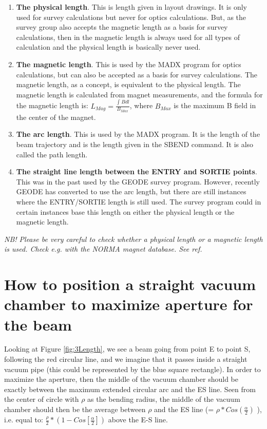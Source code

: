 \documentclass{cernatsnote}
\begin{document}
\begin{enumerate}
\item \textbf{The physical length}. This is length given in layout drawings. It is only used for survey calculations but never for optics calculations. But, as the survey group also accepts the magnetic length as a basis for survey calculations, then in the magnetic length is always used for all types of calculation and the physical length is basically never used.
\item \textbf{The magnetic length}. This is used by the MADX program for optics calculations, but can also be accepted as a basis for survey calculations. The magnetic length, as a concept, is equivalent to the physical length. The magnetic length is calculated from magnet measurements, and the formula for the magnetic length is: $L_{Mag}=\frac {\int_{ }^{ } B dl}{B_{Max}}$, where $B_{Max}$ is the maximum B field in the center of the magnet.
\item \textbf{The arc length}. This is used by the MADX program. It is the length of the beam trajectory and is the length given in the SBEND command. It is also called the path length.
\item \textbf{The straight line length between the ENTRY and SORTIE points}. This was in the past used by the GEODE survey program. However, recently GEODE has converted to use the arc length, but there are still instances where the ENTRY/SORTIE length is still used. The survey program could in certain instances base this length on either the physical length or the magnetic length.
\end{enumerate}

\noindent \textit{NB! Please be very careful to check whether a physical length or a magnetic length is used. Check e.g. with the NORMA magnet database. See ref.\cite{NORMA} } 

\section{How to position a straight vacuum chamber to maximize aperture for the beam}
Looking at Figure \ref{fig:3Length}, we see a beam going from point E to point S, following the red circular line, and we imagine that it passes inside a straight vacuum pipe (this could be represented by the blue square rectangle). In order to maximize the aperture, then the middle of the vacuum chamber should be exactly between the maximum extended circular arc and the ES line. Seen from the center of circle with $ \rho$ as the bending radius, the middle of the vacuum chamber should then be the average between $ \rho $ and the ES line (= $ \rho *Cos(\frac {\alpha}{2} )$ ), i.e. equal to:
$ \frac{\rho}{2} * (1 - Cos[\frac{\alpha}{2}])$ above the E-S line. \\
\end{document}
